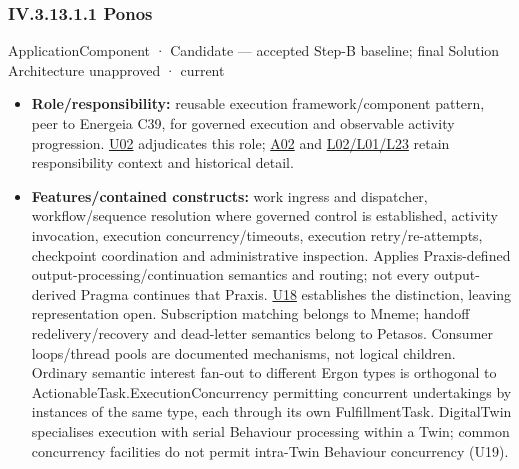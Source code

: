 \subsubsection*{IV.3.13.1.1 Ponos}
\label{navigation:IV.3.13.1.1}

\label{element:b521762c1ea444b48cd5f66be3752d30}
{\small ApplicationComponent · Candidate — accepted Step-B baseline; final Solution Architecture unapproved · current}\par

\begin{itemize}


\item \textbf{Role/responsibility:} reusable execution framework/component pattern, peer
  to Energeia C39, for governed execution and observable activity progression.
  \href{\detokenize{../../../../../docs/markdown/05-information-systems-architecture/sources.md#u02}}{U02} adjudicates this role; \href{\detokenize{../../../../../docs/markdown/05-information-systems-architecture/sources.md#a02}}{A02} and
  \href{\detokenize{../../../../../docs/markdown/05-information-systems-architecture/sources.md#l02}}{L02/L01/L23} retain responsibility context and historical detail.

\item \textbf{Features/contained constructs:} work ingress and dispatcher, workflow/sequence
  resolution where governed control is established, activity invocation, execution
  concurrency/timeouts, execution retry/re-attempts, checkpoint coordination and
  administrative inspection. Applies Praxis-defined output-processing/continuation
  semantics and routing; not every output-derived Pragma continues that Praxis.
  \href{\detokenize{../../../../../docs/markdown/05-information-systems-architecture/sources.md#u18}}{U18} establishes the distinction, leaving representation open.
  Subscription matching belongs to Mneme; handoff
  redelivery/recovery and dead-letter semantics belong to Petasos.
  Consumer loops/thread pools are documented mechanisms, not logical children.
  Ordinary semantic interest fan-out to different Ergon types is orthogonal to
  ActionableTask.ExecutionConcurrency permitting concurrent undertakings by
  instances of the same type, each through its own FulfillmentTask. DigitalTwin
  specialises execution with serial Behaviour processing within a Twin; common
  concurrency facilities do not permit intra-Twin Behaviour concurrency (U19).


\end{itemize}
